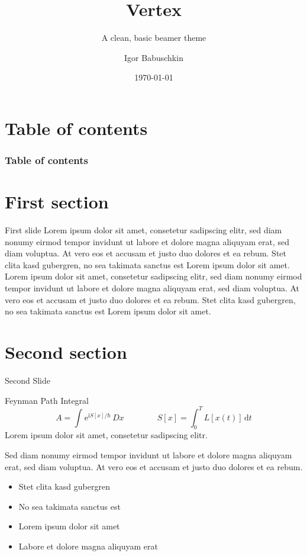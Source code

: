 \documentclass[compress,aspectratio=1610]{beamer}
\title{Vertex}
\subtitle{A clean, basic beamer theme}
\date{\today}
\author{Igor Babuschkin}
\begin{document}
\maketitle

\section*{Table of contents}
\begin{frame}
	\frametitle{Table of contents}
  \centering
	\tableofcontents[hideallsubsections]
\end{frame}

\section{First section}
\begin{frame}{First slide}
	Lorem ipsum dolor sit amet, consetetur sadipscing elitr, sed diam nonumy eirmod tempor invidunt ut labore et dolore magna aliquyam erat, sed diam voluptua. At vero eos et accusam et justo duo dolores et ea rebum. Stet clita kasd gubergren, no sea takimata sanctus est Lorem ipsum dolor sit amet. Lorem  ipsum dolor sit amet, consetetur sadipscing elitr, sed diam nonumy eirmod tempor invidunt ut labore et dolore magna aliquyam erat, sed diam voluptua. At vero eos et accusam et justo duo dolores et ea rebum. Stet clita kasd gubergren, no sea takimata sanctus est Lorem ipsum dolor sit amet.
\end{frame}

\section{Second section}
\begin{frame}{Second Slide}
  \begin{block}{Feynman Path Integral}
    \begin{equation*}
      A = \int^{}\mathrm{e}^{\mathrm{i} S[x] / \hbar}\,Dx \hspace{4em} S[x] = \int^{T}_0 L[x(t)]\,\mathrm{d}t
    \end{equation*}
    \centering
Lorem ipsum dolor sit amet, consetetur sadipscing elitr.
  \end{block}
  \begin{multicols}{2}
Sed diam nonumy eirmod tempor invidunt ut labore et dolore magna aliquyam erat, sed diam voluptua. At vero eos et accusam et justo duo dolores et ea rebum.
  \columnbreak
  \begin{itemize}
    \item Stet clita kasd gubergren
    \item No sea takimata sanctus est
    \item Lorem ipsum dolor sit amet
    \item Labore et dolore magna aliquyam erat
  \end{itemize}
  \end{multicols}
\end{frame}
\end{document}
